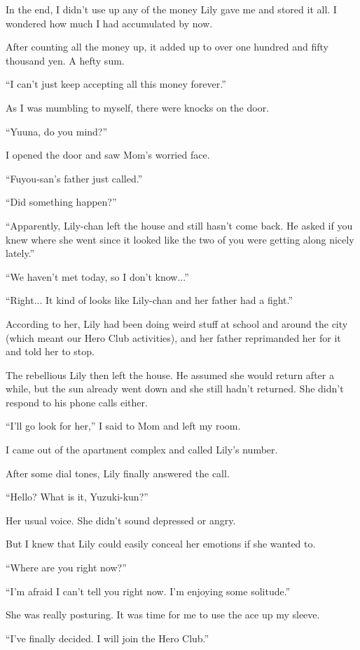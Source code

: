 In the end, I didn't use up any of the money Lily gave me and stored it all. I wondered how much I had accumulated by now.

After counting all the money up, it added up to over one hundred and fifty thousand yen. A hefty sum.

``I can't just keep accepting all this money forever.''

As I was mumbling to myself, there were knocks on the door.

``Yuuna, do you mind?''

I opened the door and saw Mom's worried face.

``Fuyou-san's father just called.''

``Did something happen?''

``Apparently, Lily-chan left the house and still hasn't come back. He asked if you knew where she went since it looked like the two of you were getting along nicely lately.''

``We haven't met today, so I don't know...''

``Right... It kind of looks like Lily-chan and her father had a fight.''

According to her, Lily had been doing weird stuff at school and around the city (which meant our Hero Club activities), and her father reprimanded her for it and told her to stop.

The rebellious Lily then left the house. He assumed she would return after a while, but the sun already went down and she still hadn't returned. She didn't respond to his phone calls either.

``I'll go look for her,'' I said to Mom and left my room.

I came out of the apartment complex and called Lily's number.

After some dial tones, Lily finally answered the call.

``Hello? What is it, Yuzuki-kun?''

Her usual voice. She didn't sound depressed or angry.

But I knew that Lily could easily conceal her emotions if she wanted to.

``Where are you right now?''

``I'm afraid I can't tell you right now. I'm enjoying some solitude.''

She was really posturing. It was time for me to use the ace up my sleeve.

``I've finally decided. I will join the Hero Club.''

